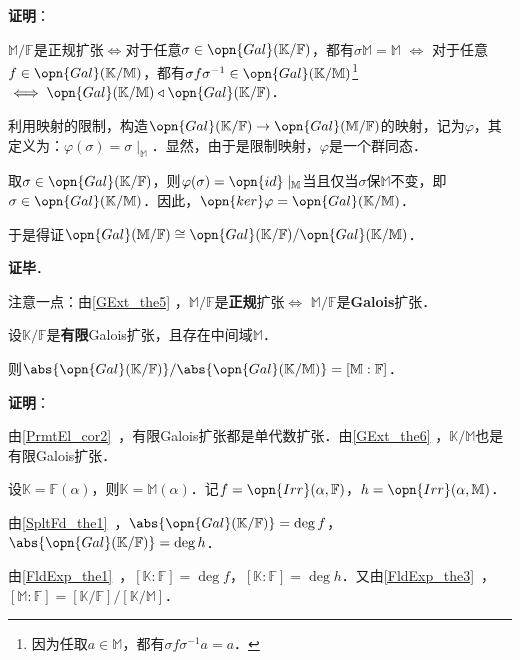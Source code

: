 \textbf{证明}：

$\mathbb{M}/\mathbb{F}$是正规扩张$\iff$对于任意$\sigma\in\opn{Gal}(\mathbb{K}/\mathbb{F})$，都有$\sigma\mathbb{M}=\mathbb{M}$ $\iff$ 对于任意$f\in\opn{Gal}(\mathbb{K}/\mathbb{M})$，都有$\sigma f \sigma^{-1}\in\opn{Gal}(\mathbb{K}/\mathbb{M})$\footnote{因为任取$a\in\mathbb{M}$，都有$\sigma f \sigma^{-1} a=a$．} $\iff\opn{Gal}(\mathbb{K/\mathbb{M}})\triangleleft\opn{Gal}(\mathbb{K/\mathbb{F}})$．

利用映射的限制，构造$\opn{Gal}(\mathbb{K}/\mathbb{F})\to\opn{Gal}(\mathbb{M}/\mathbb{F})$的映射，记为$\varphi$，其定义为：$\varphi(\sigma) = \sigma\mid_{\mathbb{M}}$．显然，由于是限制映射，$\varphi$是一个群同态．

取$\sigma\in\opn{Gal}(\mathbb{K}/\mathbb{F})$，则$\varphi(\sigma)=\opn{id}\mid_{\mathbb{M}}$当且仅当$\sigma$保$\mathbb{M}$不变，即$\sigma\in\opn{Gal}(\mathbb{K}/\mathbb{M})$．因此，$\opn{ker}\varphi=\opn{Gal}(\mathbb{K}/\mathbb{M})$．

于是得证$\opn{Gal}(\mathbb{M}/\mathbb{F})\cong \opn{Gal}(\mathbb{K}/\mathbb{F})/\opn{Gal}(\mathbb{K}/\mathbb{M})$．


\textbf{证毕}．


注意一点：由\autoref{GExt_the5} ，$\mathbb{M}/\mathbb{F}$是\textbf{正规}扩张$\iff$ $\mathbb{M}/\mathbb{F}$是\textbf{Galois}扩张．



\begin{theorem}{}\label{GExt_the9}
设$\mathbb{K}/\mathbb{F}$是\textbf{有限}Galois扩张，且存在中间域$\mathbb{M}$．

则$\abs{\opn{Gal}(\mathbb{K}/\mathbb{F})}/\abs{\opn{Gal}(\mathbb{K}/\mathbb{M})}=[\mathbb{M}:\mathbb{F}]$．
\end{theorem}

\textbf{证明}：

由\autoref{PrmtEl_cor2}~，有限Galois扩张都是单代数扩张．由\autoref{GExt_the6} ，$\mathbb{K}/\mathbb{M}$也是有限Galois扩张．

设$\mathbb{K}=\mathbb{F}(\alpha)$，则$\mathbb{K}=\mathbb{M}(\alpha)$．记$f=\opn{Irr}(\alpha, \mathbb{F})$，$h=\opn{Irr}(\alpha, \mathbb{M})$．

由\autoref{SpltFd_the1}~，$\abs{\opn{Gal}(\mathbb{K}/\mathbb{F})}=\deg f$，$\abs{\opn{Gal}(\mathbb{K}/\mathbb{F})}=\deg h$．

由\autoref{FldExp_the1}~，$[\mathbb{K}:\mathbb{F}]=\deg f$，$[\mathbb{K}:\mathbb{F}]=\deg h$．又由\autoref{FldExp_the3}~，$[\mathbb{M}:\mathbb{F}]=[\mathbb{K}/\mathbb{F}]/[\mathbb{K}/\mathbb{M}]$．

